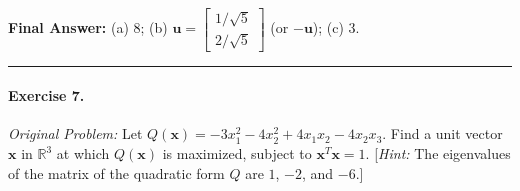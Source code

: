 \documentclass[11pt, letterpaper]{article}
\theoremstyle{definition}
\theoremstyle{remark}
\begin{document}
\textbf{Final Answer:} (a) $8$; \quad (b) $\mathbf{u} = \begin{bmatrix} 1/\sqrt{5} \\ 2/\sqrt{5} \end{bmatrix}$ (or $-\mathbf{u}$); \quad (c) $3$.

\medskip
\hrule
\medskip

\paragraph{Exercise 7.}
\emph{Original Problem:} Let $Q(\mathbf{x}) = -3x_1^2 - 4x_2^2 + 4x_1 x_2 - 4x_2 x_3$. Find a unit vector $\mathbf{x}$ in $\mathbb{R}^3$ at which $Q(\mathbf{x})$ is maximized, subject to $\mathbf{x}^T \mathbf{x} = 1$. [\emph{Hint:} The eigenvalues of the matrix of the quadratic form $Q$ are $1$, $-2$, and $-6$.]
\end{document}
